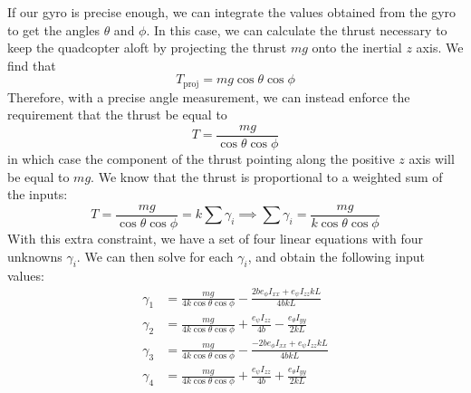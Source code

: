\documentclass{article}
\begin{document}
If our gyro is precise enough, we can integrate the values obtained from the gyro to get the angles
$\theta$ and $\phi$. In this case, we can calculate the thrust necessary to keep the quadcopter
aloft by projecting the thrust $mg$ onto the inertial $z$ axis. We find that
\[T_\text{proj} = mg\cos\theta\cos\phi\]
Therefore, with a precise angle measurement, we can instead enforce the requirement that the thrust
be equal to
\[T = \frac{mg}{\cos\theta\cos\phi}\]
in which case the component of the thrust pointing along the positive $z$ axis will be equal to $mg$.
We know that the thrust is proportional to a weighted sum of the inputs:
\[T = \frac{mg}{\cos\theta\cos\phi} = k\sum \gamma_i \implies \sum\gamma_i = \frac{mg}{k\cos\theta\cos\phi}\]
With this extra constraint, we have a set of four linear equations with four unknowns $\gamma_i$. We
can then solve for each $\gamma_i$, and obtain the following input values:
\begin{align*}
    \gamma_1 &= \frac{mg}{4k\cos\theta\cos\phi}-\frac{2 b {e_\phi} {I_{xx}}+{e_\psi} {I_{zz}} k L}{4 b k L} \\
    \gamma_2 &= \frac{mg}{4k\cos\theta\cos\phi}+\frac{ {e_\psi} {I_{zz}}}{4 b}-\frac{ {e_\theta} {I_{yy}}}{2 k L} \\
    \gamma_3 &= \frac{mg}{4k\cos\theta\cos\phi}-\frac{-2 b {e_\phi} {I_{xx}}+{e_\psi} {I_{zz}} k L}{4 b k L} \\
    \gamma_4 &= \frac{mg}{4k\cos\theta\cos\phi}+\frac{ {e_\psi} {I_{zz}}}{4 b}+\frac{ {e_\theta} {I_{yy}}}{2 k L}
\end{align*}
\end{document}
